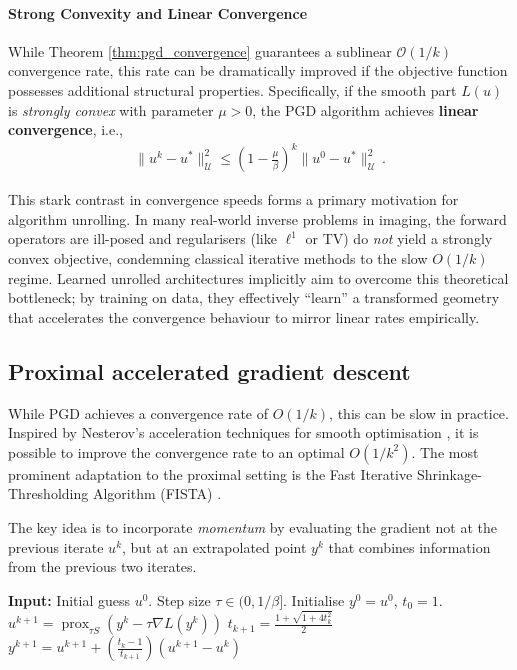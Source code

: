 \paragraph{Strong Convexity and Linear Convergence}
While Theorem \ref{thm:pgd_convergence} guarantees a sublinear $\mathcal{O}(1/k)$ convergence rate, this rate can be dramatically improved if the objective function possesses additional structural properties. Specifically, if the smooth part $L(u)$ is \emph{strongly convex} with parameter $\mu > 0$, the PGD algorithm achieves \textbf{linear convergence}, i.e.,
\begin{align*}
\|u^k - u^*\|_\mathcal{U}^2 \leq \left( 1 - \frac{\mu}{\beta} \right)^k \|u^0 - u^*\|_\mathcal{U}^2 \, .
\end{align*}

This stark contrast in convergence speeds forms a primary motivation for algorithm unrolling. In many real-world inverse problems in imaging, the forward operators are ill-posed and regularisers (like $\ell^1$ or TV) do \emph{not} yield a strongly convex objective, condemning classical iterative methods to the slow $O(1/k)$ regime. Learned unrolled architectures implicitly aim to overcome this theoretical bottleneck; by training on data, they effectively ``learn'' a transformed geometry that accelerates the convergence behaviour to mirror linear rates empirically.

\subsection{Proximal accelerated gradient descent}

While PGD achieves a convergence rate of $O(1/k)$, this can be slow in practice. Inspired by Nesterov's acceleration techniques for smooth optimisation \cite{Nesterov1983Method}, it is possible to improve the convergence rate to an optimal $O(1/k^2)$. The most prominent adaptation to the proximal setting is the Fast Iterative Shrinkage-Thresholding Algorithm (FISTA) \cite{Beck2009FISTA}.

The key idea is to incorporate \emph{momentum} by evaluating the gradient not at the previous iterate $u^k$, but at an extrapolated point $y^k$ that combines information from the previous two iterates.

\begin{algorithm}
\caption{Fast Iterative Shrinkage-Thresholding Algorithm (FISTA)}\label{alg:fista}
\begin{algorithmic}
\State \textbf{Input:} Initial guess $u^0$. Step size $\tau \in (0, 1/\beta]$. Initialise $y^0 = u^0$, $t_0 = 1$.
\State $u^{k+1} = \operatorname{prox}_{\tau S}(y^k - \tau \nabla L(y^k))$ 
\State $t_{k+1} = \frac{1 + \sqrt{1 + 4t_k^2}}{2}$ 
\State $y^{k+1} = u^{k+1} + \left(\frac{t_k - 1}{t_{k+1}}\right) (u^{k+1} - u^k)$ 
\EndFor
\end{algorithmic}
\end{algorithm}

